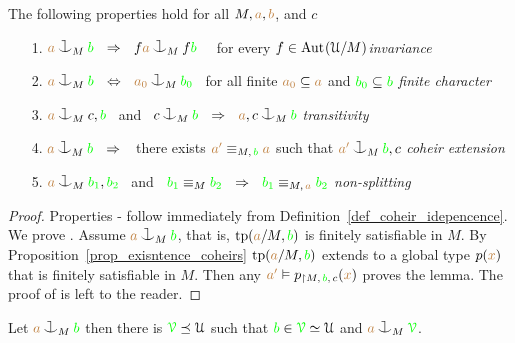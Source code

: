 \documentclass[creche.tex]{subfiles}
\begin{document}
\begin{lemma}\label{lem_coheir_independence}
    The following properties hold for all $M,{\color{brown} a},{\color{brown} b}$, and $c$
    \begin{itemize}
    \item[1.] ${\mr a}\cnonfork_M{\gr b}\ \ \IMP\ \ f{\mr a}\cnonfork_Mf{\gr b}$ \ \ 
              for every $f\in{\rm Aut\kern.15ex}(\EuScript U/M)$\hfill \textit{invariance}
    \item[2.] ${\mr a}\cnonfork_M{\gr b}\ \ \IFF\ \ {\mr a_0}\cnonfork_M{\gr b_0}$
              \ for all finite ${\color{brown} a_0}\subseteq{\color{brown}a}$ and 
              ${\color{green} b_0}\subseteq{\color{green}b}$ \hfill\textit{finite character}
    \item[3.] ${\mr a}\cnonfork_Mc,{\gr b}$ \ and \ 
              $c\cnonfork_M{\gr b}\ \ \IMP\ \ {\mr a},c\cnonfork_M{\gr b}$
              \hfill\hfill\hfill\textit{transitivity}
    \item[4.] ${\mr a}\cnonfork_M{\gr b}\ \ \IMP\ \ $ 
              there exists ${\color{brown} a'}\equiv_{M,\,{\color{green} b}}{\color{brown} a}$ such that 
              ${\mr a'}\cnonfork_M{\gr b},c$
              \textit{coheir extension}
    \item[5.] ${\mr a}\cnonfork_M{\gr b_1},{\gr b_2}$ \ and \ 
    ${\color{green} b_1}\equiv_M{\color{green} b_2}\ \ \Rightarrow\ \ {\color{green} b_1}\equiv_{M,\,{\color{brown} a}}{\color{green} b_2}$
              \hspace{\stretch{20}}\textit{non-splitting}\QED
    \end{itemize}
    \end{lemma}
\begin{proof}

Properties - follow immediately from Definition~\ref{def_coheir_idepencence}.
We prove .
Assume ${\mr a}\cnonfork_M{\gr b}$, that is,  ${\rm tp}({\color{brown} a}/M,{\color{green} b})$ is finitely satisfiable in $M$. By Proposition~\ref{prop_exisntence_coheirs} ${\rm tp}({\color{brown} a}/M,{\color{green} b})$ extends to a global type $p({\color{brown} x})$ that is finitely satisfiable in $M$.
Then any ${\color{brown} a'}\vDash p_{\restriction M,\,{\color{green} b},\,c}({\color{brown} x})$ proves the lemma.
The proof of  is left to the reader.
\end{proof}

\begin{proposition}\label{prop_saturate_heir}
  Let ${\mr a}\cnonfork_M{\gr b}$ then there is ${\color{green}\EuScript V}\preceq\EuScript U$ such that ${\color{green} b}\in{\color{green}\EuScript V}\simeq\EuScript U$ and ${\mr a}\cnonfork_M{\gr\V}$.
\end{proposition}
\end{document}
